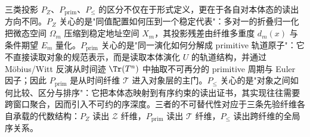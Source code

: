 \begin{remark}[三类投影的功能区分]\label{rem:pom-projection-functional-distinction}
三类投影 $P_Z$、$P_{\mathrm{prim}}$、$P_{\le}$ 的区分不仅在于形式定义，更在于各自对本体态的读出方向不同。$P_Z$ 关心的是"同值配置如何压到一个稳定代表"：多对一的折叠归一化把微态空间 $\Omega_m$ 压缩到稳定地址空间 $X_m$，其投影残差由纤维多重度 $d_m(x)$ 与条件期望 $E_m$ 量化。$P_{\mathrm{prim}}$ 关心的是"同一演化如何分解成 primitive 轨道原子"：它不直接读取对象的规范表示，而是读取本体演化 $U$ 的轨道结构，并通过 Möbius/Witt 反演从时间迹 $\Tr(T^n)$ 中抽取不可再分的 primitive 周期与 Euler 因子；因此 $P_{\mathrm{prim}}$ 是从时间纤维 $\mathcal{T}$ 进入对象层的主门。$P_{\le}$ 关心的是"对象之间如何比较、区分与排序"：它把本体态映射到有序约束的读出证书，其实现往往需要跨窗口聚合，因而引入不可约的序深度。三者的不可替代性对应于三条先验纤维各自承载的代数结构：$P_Z$ 读出 $\mathcal{Z}$ 纤维，$P_{\mathrm{prim}}$ 读出 $\mathcal{T}$ 纤维，$P_{\le}$ 读出跨纤维的全局序关系。
\end{remark}
